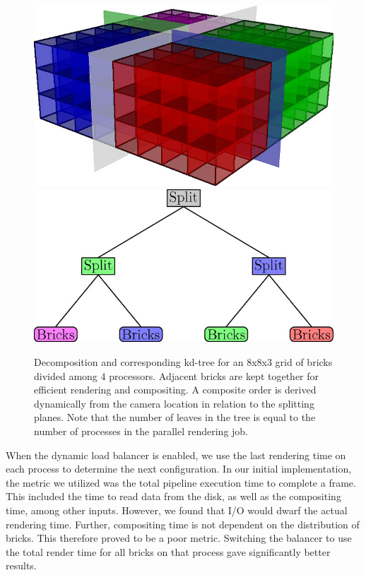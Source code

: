 \begin{figure}
  \includegraphics[width=0.49\linewidth]{images/multiscale/bricks.jpg}
  \includegraphics[width=0.49\linewidth]{images/multiscale/tree.jpg}
  \caption{Decomposition and corresponding kd-tree for an 8x8x3 grid
  of bricks divided among 4 processors.  Adjacent bricks are kept
  together for efficient rendering and compositing.  A composite order
  is derived dynamically from the camera location in relation to the
  splitting planes.  Note that the number of leaves in the tree is
  equal to the number of processes in the parallel rendering job.}
  \label{fig:decomposition}
\end{figure}

When the dynamic load balancer is enabled, we use the last rendering
time on each process to determine the next configuration.  In our
initial implementation, the metric we utilized was the total pipeline
execution time to complete a frame.  This included the time to read
data from the disk, as well as the compositing time, among other
inputs.  However, we found that I/O would dwarf the actual rendering
time.  Further, compositing time is not dependent on the distribution
of bricks.  This therefore proved to be a poor metric.  Switching the
balancer to use the total render time for all bricks on that process
gave significantly better results.

